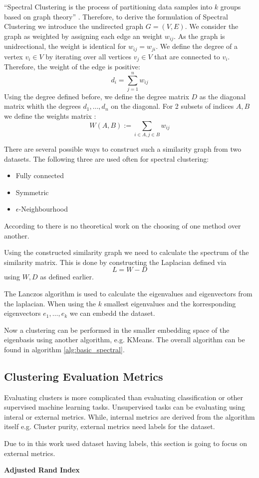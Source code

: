 \enquote{Spectral Clustering is the process of partitioning data samples into
\(k\) groups based on graph theory} \cite{krajsek_helmholtz_nodate}. Therefore,
to derive the formulation of Spectral Clustering we introduce the undirected graph \(G=(V, E)\).
We consider the graph as weighted by assigning each edge an weight \(w_{ij}\). As the graph
is unidrectional, the weight is identical for \(w_{ij} = w_{ji} \).
We define the degree of a vertex \(v_i \in V\) by iterating over all vertices \(v_j \in V\) that are connected to \(v_i\).
Therefore, the weight of the edge is positive:
\[d_i = \sum_{j=1}^n w_{ij}\]
Using the degree defined before, we define the degree matrix \(D\) as the diagonal matrix whith the degrees \(d_1, \ldots, d_n\) on the diagonal.
\cite{von_luxburg_tutorial_2007}
For 2 subsets of indices \(A, B\) we define the weights matrix \cite{von_luxburg_tutorial_2007}:
\[W(A, B) := \sum_{i \in A, j \in B} w_{ij}\]


There are several possible ways to construct such a similarity graph from two datasets.
The following three are used often for spectral clustering:
\begin{itemize}
  \item Fully connected
  \item Symmetric
  \item \(\epsilon\)-Neighbourhood
\end{itemize}
According to \cite{von_luxburg_tutorial_2007} there is no theoretical work on the choosing of one method over
another.

Using the constructed similarity graph we need to calculate the spectrum of the similarity matrix.
This is done by constructing the Laplacian defined via
\[L = W - D\]
using \(W, D\) as defined earlier.

The Lanczos algorithm \cite{lanczos_iteration_1950} is used to calculate the eigenvalues and eigenvectors from the laplacian.
When using the \(k\) smallest eigenvalues and the korresponding eigenvectors \(e_1, \ldots, e_k\) we can embedd the dataset.

Now a clustering can be performed in the smaller embedding space of the eigenbasis using another algorithm, e.g. KMeans.
The overall algorithm can be found in algorithm \ref{alg:basic_spectral}.


\subsection{Clustering Evaluation Metrics}
\label{ssec:clustering_evaluation_metrics}

Evaluating clusters is more complicated than evaluating classification or other supervised machine learning tasks.
Unsupervised tasks can be evaluating using interal or external metrics. While, internal metrics are derived from the algorithm itself e.g. Cluster purity, external metrics need labels for the dataset.

Due to in this work used dataset having labels, this section is going to focus on external metrics.

\textbf{Adjusted Rand Index}
